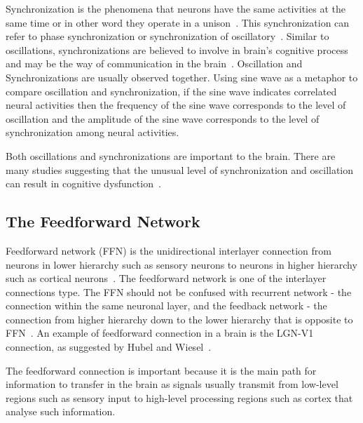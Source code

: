 Synchronization is the phenomena that neurons have the same activities at the same time or in other word they operate in a unison~\cite{ward2003synchronous}. This synchronization can refer to phase synchronization or synchronization of oscillatory~\cite{gray1996chattering, salinas2001correlated,varela2001brainweb}. Similar to oscillations, synchronizations are believed to involve in brain's cognitive process and may be the way of communication in the brain~\cite{engel2001dynamic, fries2001modulation, ward2003synchronous, womelsdorf2007modulation}. Oscillation and Synchronizations are usually observed together. Using sine wave as a metaphor to compare oscillation and synchronization, if the sine wave indicates correlated neural activities then the frequency of the sine wave corresponds to the level of oscillation and the amplitude of the sine wave corresponds to the level of synchronization among neural activities.

Both oscillations and synchronizations are important to the brain. There are many studies suggesting that the unusual level of synchronization and oscillation can result in cognitive dysfunction~\cite{bacsar2008review, dinstein2011disrupted, grice2001disordered, hammond2007pathological, schnitzler2005normal,uhlhaas2006neural, uhlhaas2010abnormal}.



\subsection{The Feedforward Network}

Feedforward network (FFN) is the unidirectional interlayer connection from neurons in lower hierarchy such as sensory neurons to neurons in higher hierarchy such as cortical neurons~\cite{felleman1991distributed, kumar2010spiking}.
The feedforward network is one of the interlayer connections type. The FFN should not be confused with recurrent network - the connection within the same neuronal layer, and the feedback network - the connection from higher hierarchy down to the lower hierarchy that is opposite to FFN~\cite{Bower2003Genesis, carnevale2006neuron, Kandel5thEdition}. 
An example of feedforward connection in a brain is the LGN-V1 connection, as suggested by Hubel and Wiesel~\cite{hubel1962receptive}.

The feedforward connection is important because it is the main path for information to transfer in the brain as signals usually transmit from low-level regions such as sensory input to high-level processing regions such as cortex that analyse such information. 

